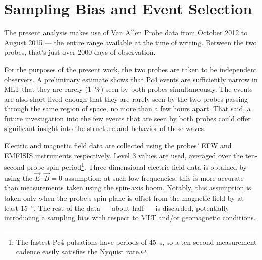 \section{Sampling Bias and Event Selection}
  \label{sec_selection}

The present analysis makes use of Van Allen Probe data from October 2012 to
August 2015 --- the entire range available at the time of writing. Between the
two probes, that's just over 2000 days of observation. 

For the purposes of the present work, the two probes are taken to be
independent observers. A preliminary estimate shows that Pc4 events are
sufficiently narrow in MLT that they are rarely (\about\SI{1}{\percent}) seen
by both probes simultaneously. The events are also short-lived enough that they
are rarely seen by the two probes passing through the same region of space, no
more than a few hours apart. That said, a future investigation into the few
events that are seen by both probes could offer significant insight into the
structure and behavior of these waves. 



Electric and magnetic field data are collected using the probes'
EFW\cite{wygant_2013} and EMFISIS instruments respectively. Level 3 values are
used, averaged over the ten-second probe spin period\footnote{The fastest Pc4
pulsations have periods of \SI{45}{\second}, so a ten-second measurement
cadence easily satisfies the Nyquist rate. }. Three-dimensional
electric field data is obtained by using the $\vec{E} \cdot \vec{B} = 0$
assumption; at such low frequencies, this is more accurate than measurements
taken using the spin-axis boom. Notably, this assumption is taken only when the
probe's spin plane is offset from the magnetic field by at least
\SI{15}{\degree}. The rest of the data --- about half --- is discarded,
potentially introducing a sampling bias with respect to MLT and/or geomagnetic
conditions.

